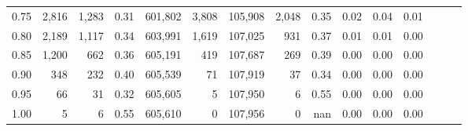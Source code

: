 \begin{tabular}{rrrrrrrrrrrrrrr}
0.75 &   2,816 &   1,283 &  0.31 &  601,802 &    3,808 &  105,908 &    2,048 &  0.35 &  0.02 &  0.04 &      0.01 \\
0.80 &   2,189 &   1,117 &  0.34 &  603,991 &    1,619 &  107,025 &      931 &  0.37 &  0.01 &  0.01 &      0.00 \\
0.85 &   1,200 &     662 &  0.36 &  605,191 &      419 &  107,687 &      269 &  0.39 &  0.00 &  0.00 &      0.00 \\
0.90 &     348 &     232 &  0.40 &  605,539 &       71 &  107,919 &       37 &  0.34 &  0.00 &  0.00 &      0.00 \\
0.95 &      66 &      31 &  0.32 &  605,605 &        5 &  107,950 &        6 &  0.55 &  0.00 &  0.00 &      0.00 \\
1.00 &       5 &       6 &  0.55 &  605,610 &        0 &  107,956 &        0 &   nan &  0.00 &  0.00 &      0.00 \\
\bottomrule
\end{tabular}
